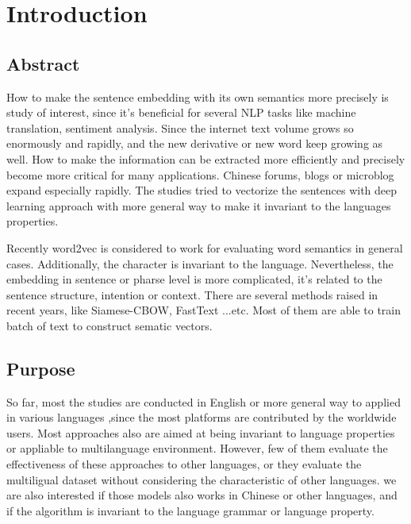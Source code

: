 \chapter{Introduction}
\setlength{\baselineskip}{1.5em}
\setlength{\parindent}{2em}
\setlength{\parskip}{1em}

\section{Abstract}

How to make the sentence embedding with its own semantics more precisely is study of interest, since it's beneficial for several NLP tasks like machine translation, sentiment analysis. 
Since the internet text volume grows so enormously and rapidly, and the new derivative or new word keep growing as well.
How to make the information can be extracted more efficiently and precisely become more critical for many applications.  
Chinese forums, blogs or microblog expand especially rapidly. The studies tried to vectorize the sentences with deep learning approach with more general way to make it invariant to the languages properties.  


Recently word2vec\cite{word2vec} is considered to work for evaluating word semantics in general cases.  
Additionally, the character is invariant to the language. Nevertheless, 
the embedding in sentence or pharse level is more complicated, it's related to the sentence structure,  
intention or context. There are several methods raised in recent years, like Siamese-CBOW, FastText ...etc. 
Most of them are able to train batch of text to construct sematic vectors.

\section{Purpose}

So far, most the studies are conducted in English or more general way to applied in various languages
,since the most platforms are contributed by the worldwide users. Most approaches also are aimed at being invariant to language properties or appliable to multilanguage environment. 
However, few of them evaluate the effectiveness of these approaches to other languages, or they evaluate the multiligual dataset without considering the characteristic of other languages.   
we are also interested if those models also works in Chinese or other languages, and if the algorithm is invariant to the language grammar or language property. 